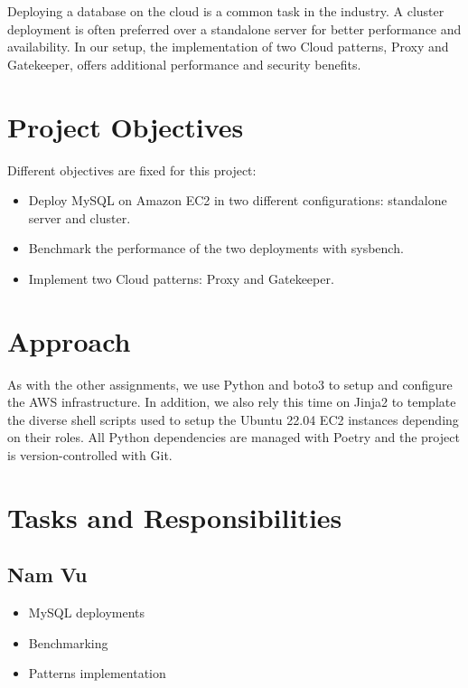 \documentclass[letterpaper,headings=standardclasses,parskip=half]{scrartcl}
\begin{document}
Deploying a database on the cloud is a common task in the industry. A cluster deployment is often preferred over a standalone server for better performance and availability. In our setup, the implementation of two Cloud patterns, Proxy and Gatekeeper, offers additional performance and security benefits.

\section{Project Objectives}

Different objectives are fixed for this project:

\begin{itemize}
    \item Deploy MySQL on Amazon EC2 in two different configurations: standalone server and cluster.
    \item Benchmark the performance of the two deployments with sysbench.
    \item Implement two Cloud patterns: Proxy and Gatekeeper.
\end{itemize}

\section{Approach}

As with the other assignments, we use Python and boto3 to setup and configure the AWS infrastructure. In addition, we also rely this time on Jinja2 to template the diverse shell scripts used to setup the Ubuntu 22.04 EC2 instances depending on their roles. All Python dependencies are managed with Poetry and the project is version-controlled with Git.

\section{Tasks and Responsibilities}

\subsection*{Nam Vu}

\begin{itemize}
    \item MySQL deployments
    \item Benchmarking
    \item Patterns implementation
\end{itemize}
\end{document}
